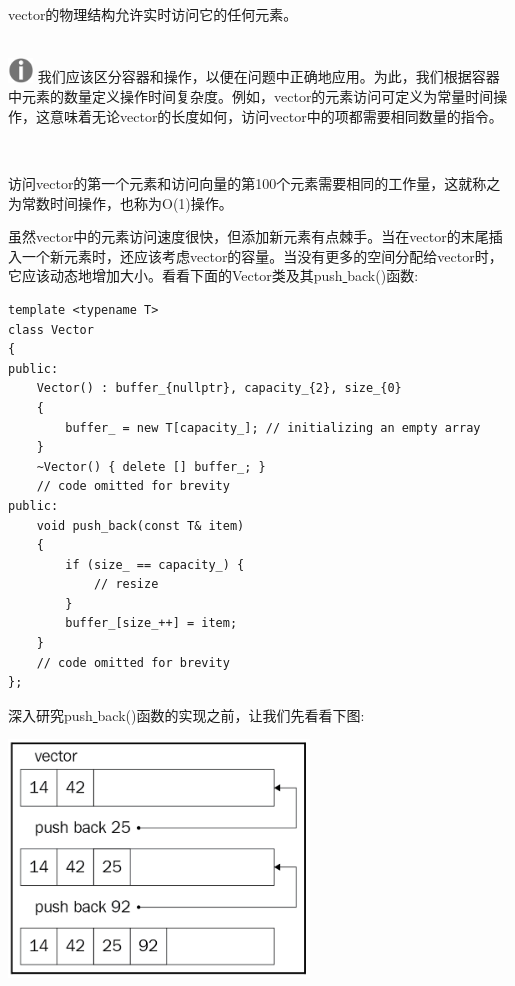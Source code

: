 vector的物理结构允许实时访问它的任何元素。 \par

\hspace*{\fill} \\ %
\includegraphics[width=0.05\textwidth]{images/warn}
我们应该区分容器和操作，以便在问题中正确地应用。为此，我们根据容器中元素的数量定义操作时间复杂度。例如，vector的元素访问可定义为常量时间操作，这意味着无论vector的长度如何，访问vector中的项都需要相同数量的指令。 \par
\noindent\textbf{}\ \par

访问vector的第一个元素和访问向量的第100个元素需要相同的工作量，这就称之为常数时间操作，也称为O(1)操作。 \par

虽然vector中的元素访问速度很快，但添加新元素有点棘手。当在vector的末尾插入一个新元素时，还应该考虑vector的容量。当没有更多的空间分配给vector时，它应该动态地增加大小。看看下面的Vector类及其push\underline{ }back()函数: \par

\begin{lstlisting}[caption={}]
template <typename T>
class Vector
{
public:
	Vector() : buffer_{nullptr}, capacity_{2}, size_{0}
	{
		buffer_ = new T[capacity_]; // initializing an empty array
	}
	~Vector() { delete [] buffer_; }
	// code omitted for brevity
public:
	void push_back(const T& item)
	{
		if (size_ == capacity_) {
			// resize
		}
		buffer_[size_++] = item;
	}
	// code omitted for brevity
};
\end{lstlisting}

深入研究push\underline{ }back()函数的实现之前，让我们先看看下图: \par

\begin{center}
	\includegraphics[width=0.6\textwidth]{content/Section-2/Chapter-6/3}
\end{center}

